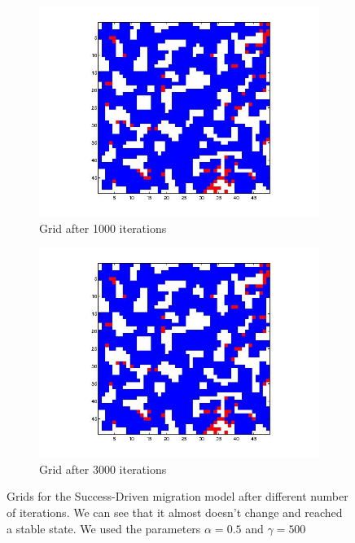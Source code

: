 \documentclass[11pt]{article}
\begin{document}
\begin{figure}
	\centering
	\begin{subfigure}[t]{0.4\textwidth}
        \includegraphics[width=\textwidth]{../../other/grids/m2-t1000.jpg}
	\caption{Grid after 1000 iterations}
    	\end{subfigure}
	\begin{subfigure}[t]{0.4\textwidth}
        \includegraphics[width=\textwidth]{../../other/grids/m2-t3000.jpg}
	\caption{Grid after 3000 iterations}
    	\end{subfigure}

	\caption{Grids for the Success-Driven migration model after different number of iterations. We can see that it almost doesn't change and reached a stable state. We used the parameters $\alpha = 0.5$ and $\gamma = 500$}
	\label{fig:grids_stable}
\end{figure}
\end{document}
